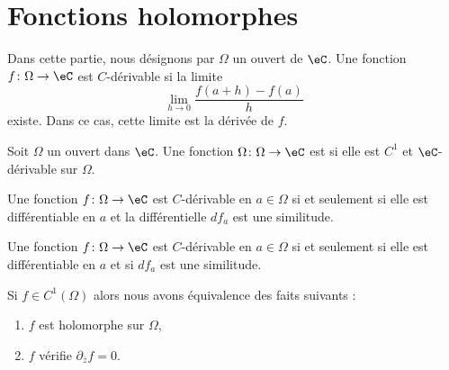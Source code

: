 
\section{Fonctions holomorphes}

Dans cette partie, nous désignons par \( \Omega\) un ouvert de \( \eC\). Une fonction \( f\colon \Omega\to \eC\) est $C$-dérivable si la limite
\begin{equation}
    \lim_{h\to 0} \frac{ f(a+h)-f(a) }{ h }
\end{equation}
existe. Dans ce cas, cette limite est la dérivée de \( f\).

\begin{definition}
    Soit \( \Omega\) un ouvert dans \( \eC\). Une fonction \( \Omega\colon \Omega\to \eC\) est  si elle est \( C^1\) et \( \eC\)-dérivable sur \( \Omega\). 
\end{definition}

\begin{proposition}
    Une fonction \( f\colon\Omega \to \eC\) est $C$-dérivable en \( a\in\Omega\) si et seulement si elle est différentiable en \( a\) et la différentielle \( df_a\) est une similitude.
\end{proposition}

\begin{proposition}
    Une fonction \( f\colon \Omega\to \eC\) est $C$-dérivable en \( a\in\Omega\) si et seulement si elle est différentiable en \( a\) et si \( df_a\) est une similitude.
\end{proposition}

\begin{theorem}
    Si \( f\in C^1(\Omega)\) alors nous avons équivalence des faits suivants :
    \begin{enumerate}
        \item
            \( f\) est holomorphe sur \( \Omega\),
        \item
            \( f\) vérifie \( \partial_{\bar z}f=0\).
    \end{enumerate}
\end{theorem}

